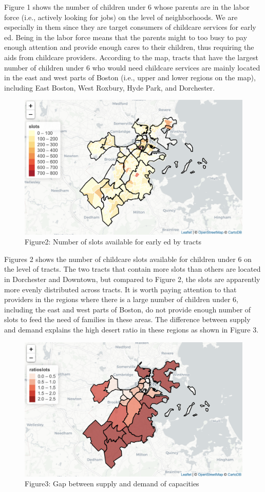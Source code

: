 \documentclass[10pt,letterpaper]{article}
\begin{document}
Figure 1 shows the number of children under 6 whose parents are in the
labor force (i.e., actively looking for jobs) on the level of
neighborhoods. We are especially in them since they are target consumers
of childcare services for early ed. Being in the labor force means that
the parents might to too busy to pay enough attention and provide enough
cares to their children, thus requiring the aids from childcare
providers. According to the map, tracts that have the largest number of
children under 6 who would need childcare services are mainly located in
the east and west parts of Boston (i.e., upper and lower regions on the
map), including East Boston, West Roxbury, Hyde Park, and Dorchester.

\begin{figure}

{\centering \includegraphics[width=0.25\linewidth]{fig2} 

}

\caption{Figure2: Number of slots available for early ed by tracts}\label{fig:unnamed-chunk-4}
\end{figure}

Figures 2 shows the number of childcare slots available for children
under 6 on the level of tracts. The two tracts that contain more slots
than others are located in Dorchester and Downtown, but compared to
Figure 2, the slots are apparently more evenly distributed across
tracts. It is worth paying attention to that providers in the regions
where there is a large number of children under 6, including the east
and west parts of Boston, do not provide enough number of slots to feed
the need of families in these areas. The difference between supply and
demand explains the high desert ratio in these regions as shown in
Figure 3.

\begin{figure}

{\centering \includegraphics[width=1\linewidth]{fig3} 

}

\caption{Figure3: Gap between supply and demand of capacities}\label{fig:unnamed-chunk-5}
\end{figure}
\end{document}
